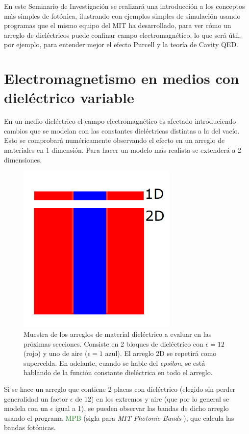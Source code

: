\documentclass{book}
\begin{document}
En este Seminario de Investigación se realizará una introducción a los conceptos más simples de fotónica, ilustrando con ejemplos simples de simulación usando programas que el mismo equipo del MIT ha desarrollado, para ver cómo un arreglo de dieléctricos puede confinar campo electromagnético, lo que será útil, por ejemplo, para entender mejor el efecto Purcell y la teoría de Cavity QED.

\section{Electromagnetismo en medios con dieléctrico variable}
 
En un medio dieléctrico el campo electromagnético es afectado introduciendo cambios que se modelan con las constantes dieléctricas distintas a la del vacío. Esto se comprobará numéricamente observando el efecto en un arreglo de materiales en 1 dimensión. Para hacer un modelo más realista se extenderá a 2 dimensiones.

 \begin{figure}[ht]
 \centering
   \includegraphics[width=0.7\textwidth]{epsilon.png}
   \caption{Muestra de los arreglos de material dieléctrico a evaluar en las próximas secciones. Consiste en 2 bloques de dieléctrico con $\epsilon=12$ (rojo) y uno de aire ($\epsilon=1$ azul). El arreglo 2D se repetirá como supercelda. En adelante, cuando se hable del \textit{epsilon}, se está hablando de la función constante dieléctrica en todo el arreglo.}
 \end{figure}

Si se hace un arreglo que contiene 2 placas con dieléctrico (elegido sin perder generalidad un factor $\epsilon$ de 12) en los extremos y aire (que por lo general se modela con un $\epsilon$ igual a 1), se pueden observar las bandas de dicho arreglo usando el programa \textcolor{ForestGreen}{MPB} (sigla para \textit{MIT Photonic Bands} \textcolor{red} {\cite{MPB}} ), que calcula las bandas fotónicas.
\end{document}

